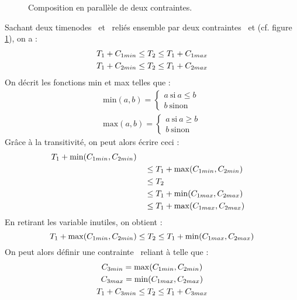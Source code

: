 \begin{figure}[ht]
    \centering
    \caption{Composition en parallèle de deux contraintes. \label{figParallele}}
\end{figure}
Sachant deux timenodes ~et ~reliés ensemble par deux contraintes ~et (cf. figure \ref{figParallele}), on a :
\begin{gather} 
    T_{1} + C_{1min} \leq T_{2} \leq T_{1} + C_{1max}\\
    T_{1} + C_{2min} \leq T_{2} \leq T_{1} + C_{2max}
\end{gather}
On décrit les fonctions min et max telles que : 
\begin{gather}
    \mathrm{min}(a,b) = \left\{\begin{matrix}
        a~\text{si}~a\leq b \\
        b~\text{sinon}
        \end{matrix}\right.\\
    \mathrm{max}(a,b) = \left\{\begin{matrix}
        a~\text{si}~a\geq b \\
        b~\text{sinon}
        \end{matrix}\right.
\end{gather}
Grâce à la transitivité, on peut alors écrire ceci :
\begin{equation}
    \begin{split}
        T_{1} + \mathrm{min}(C_{1min}, C_{2min})\\
        &\quad \leq T_{1} + \mathrm{max}(C_{1min}, C_{2min})\\
        &\quad \leq T_{2}\\
        &\quad \leq T_{1} + \mathrm{min}(C_{1max}, C_{2max})\\
        &\quad \leq T_{1} + \mathrm{max}(C_{1max}, C_{2max})
    \end{split}
\end{equation} 
En retirant les variable inutiles, on obtient :
\begin{equation}
    T_{1} + \mathrm{max}(C_{1min}, C_{2min}) \leq T_{2} \leq T_{1} + \mathrm{min}(C_{1max}, C_{2max})
\end{equation} 
On peut alors définir une contrainte ~reliant  à  telle que :
\begin{gather}
    C_{3min} = \mathrm{max}(C_{1min}, C_{2min})\\
    C_{3max} = \mathrm{min}(C_{1max}, C_{2max})\\
    T_{1} + C_{3min} \leq T_{2} \leq T_{1} + C_{3max}
\end{gather}

